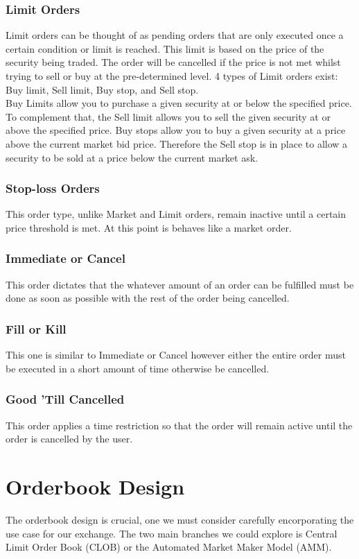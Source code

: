 \documentclass[12pt]{article}
\theoremstyle{definition}
\begin{document}
\subsubsection{Limit Orders}
Limit orders can be thought of as pending orders that are only executed once a 
certain condition or limit is reached. This limit is based on the price of the
security being traded. The order will be cancelled if the price is not met 
whilst trying to sell or buy at the pre-determined level. 4 types of Limit 
orders exist: Buy limit, Sell limit, Buy stop, and Sell stop. 
\\
Buy Limits allow you to purchase a given security at or below the specified 
price. To complement that, the Sell limit allows you to sell the given security
at or above the specified price. 
Buy stops allow you to buy a given security at a price above the current
market bid price. Therefore the Sell stop is in place to allow a security to 
be sold at a price below the current market ask.

\subsubsection{Stop-loss Orders}
This order type, unlike Market and Limit orders, remain inactive until a certain
price threshold is met. At this point is behaves like a market order.

\subsubsection{Immediate or Cancel}
This order dictates that the whatever amount of an order can be fulfilled must 
be done as soon as possible with the rest of the order being cancelled.


\subsubsection{Fill or Kill}
This one is similar to Immediate or Cancel however either the entire order must
be executed in a short amount of time otherwise be cancelled. 


\subsubsection{Good 'Till Cancelled}
This order applies a time restriction so that the order will remain active 
until the order is cancelled by the user.


\section{Orderbook Design}
The orderbook design is crucial, one we must consider carefully encorporating
the use case for our exchange. The two main branches we could explore is 
Central Limit Order Book (CLOB) or the Automated Market Maker Model (AMM). 
\end{document}
